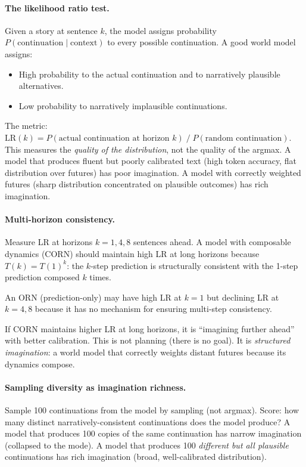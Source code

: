 \documentclass[11pt, a4paper]{article}
\theoremstyle{plain}
\theoremstyle{definition}
\theoremstyle{remark}
\begin{document}
\paragraph{The likelihood ratio test.}
Given a story at sentence $k$, the model assigns probability $P(\text{continuation} \mid \text{context})$ to every possible continuation.
A good world model assigns:
\begin{itemize}[nosep]
    \item High probability to the actual continuation and to narratively plausible alternatives.
    \item Low probability to narratively implausible continuations.
\end{itemize}

The metric: $\text{LR}(k) = P(\text{actual continuation at horizon } k) \;/\; P(\text{random continuation})$.
This measures the \emph{quality of the distribution}, not the quality of the argmax.
A model that produces fluent but poorly calibrated text (high token accuracy, flat distribution over futures) has poor imagination.
A model with correctly weighted futures (sharp distribution concentrated on plausible outcomes) has rich imagination.

\paragraph{Multi-horizon consistency.}
Measure LR at horizons $k = 1, 4, 8$ sentences ahead.
A model with composable dynamics (CORN) should maintain high LR at long horizons because $T(k) = T(1)^k$: the $k$-step prediction is structurally consistent with the 1-step prediction composed $k$ times.

An ORN (prediction-only) may have high LR at $k{=}1$ but declining LR at $k{=}4, 8$ because it has no mechanism for ensuring multi-step consistency.

If CORN maintains higher LR at long horizons, it is ``imagining further ahead'' with better calibration.
This is not planning (there is no goal).
It is \emph{structured imagination}: a world model that correctly weights distant futures because its dynamics compose.

\paragraph{Sampling diversity as imagination richness.}
Sample 100 continuations from the model by sampling (not argmax).
Score: how many distinct narratively-consistent continuations does the model produce?
A model that produces 100 copies of the same continuation has narrow imagination (collapsed to the mode).
A model that produces 100 \emph{different but all plausible} continuations has rich imagination (broad, well-calibrated distribution).
\end{document}

